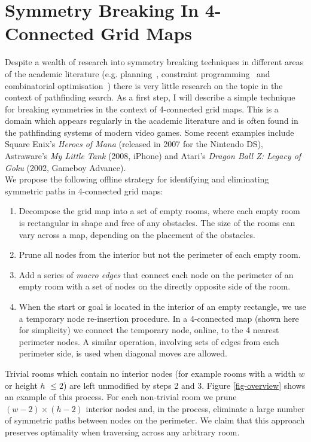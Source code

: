 \section{Symmetry Breaking In 4-Connected Grid Maps}
\label{sec::rsr::symm4c}
Despite a wealth of research into symmetry breaking techniques in different
areas of the academic literature (e.g. planning~\cite{fox99}, constraint programming~\cite{walsh07}
and combinatorial optimisation~\cite{fukunaga08}) there is very little research on the topic 
in the context of pathfinding search.
As a first step, I will describe a simple technique for breaking symmetries in the context 
of 4-connected grid maps.
This is a domain which appears regularly in the academic literature
\cite{yap02,wang08,pochter09} and is often found in the pathfinding systems of
modern video games.  Some recent examples include Square Enix's \emph{Heroes of
Mana} (released in 2007 for the Nintendo DS), Astraware's \emph{My Little Tank}
(2008, iPhone) and Atari's \emph{Dragon Ball Z: Legacy of Goku} (2002, Gameboy
Advance).
\\
We propose the following offline strategy for identifying and eliminating symmetric paths in 
4-connected grid maps:

\begin{enumerate}
\item{Decompose the grid map into a set of empty rooms, where each empty room is
rectangular in shape and free of any obstacles.  The size of the rooms can vary
across a map, depending on the placement of the obstacles.}
\item{Prune all nodes from the interior but not the perimeter of each empty
room.}
\item{Add a series of \emph{macro edges} that connect each node on the perimeter
of an empty room with a set of nodes on the directly opposite side of the room.}
\item{When the start or goal is located in the interior of an empty rectangle, we use
a temporary node re-insertion procedure.  In a 4-connected map (shown here for
simplicity) we connect the temporary node, online, to the 4 nearest perimeter
nodes. A similar operation, involving sets of edges from each perimeter side, is
used when diagonal moves are allowed.}
\end{enumerate}

Trivial rooms which contain no interior nodes (for example rooms with a width $w$ or height $h$ 
$\leq 2$) are left unmodified by steps 2 and 3.
Figure \ref{fig-overview} shows an example of this process.
For each non-trivial room we prune $(w-2)\times(h-2)$ interior
nodes and, in the process, eliminate a large number of symmetric paths between 
nodes on the perimeter.
We claim that this approach preserves optimality when traversing across any arbitrary room.

